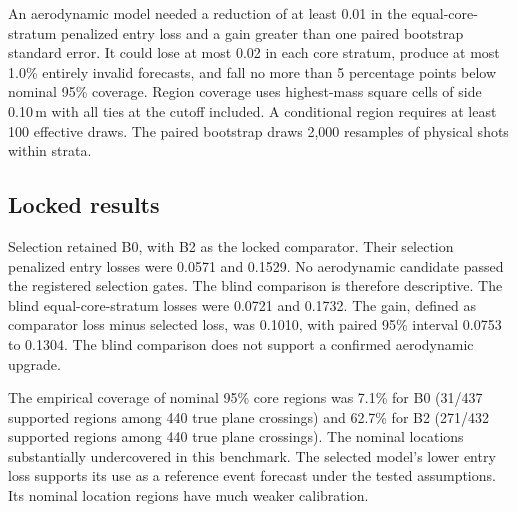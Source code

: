 An aerodynamic model needed a reduction of at least 0.01 in the equal-core-stratum penalized entry loss and a gain greater than one paired bootstrap standard error. It could lose at most 0.02 in each core stratum, produce at most 1.0\% entirely invalid forecasts, and fall no more than 5 percentage points below nominal 95\% coverage. Region coverage uses highest-mass square cells of side 0.10\,m with all ties at the cutoff included. A conditional region requires at least 100 effective draws. The paired bootstrap draws 2,000 resamples of physical shots within strata.

\subsection{Locked results}

Selection retained B0, with B2 as the locked comparator. Their selection penalized entry losses were 0.0571 and 0.1529. No aerodynamic candidate passed the registered selection gates. The blind comparison is therefore descriptive. The blind equal-core-stratum losses were 0.0721 and 0.1732. The gain, defined as comparator loss minus selected loss, was 0.1010, with paired 95\% interval 0.0753 to 0.1304. The blind comparison does not support a confirmed aerodynamic upgrade.

The empirical coverage of nominal 95\% core regions was 7.1\% for B0 (31/437 supported regions among 440 true plane crossings) and 62.7\% for B2 (271/432 supported regions among 440 true plane crossings). The nominal locations substantially undercovered in this benchmark. The selected model's lower entry loss supports its use as a reference event forecast under the tested assumptions. Its nominal location regions have much weaker calibration.

